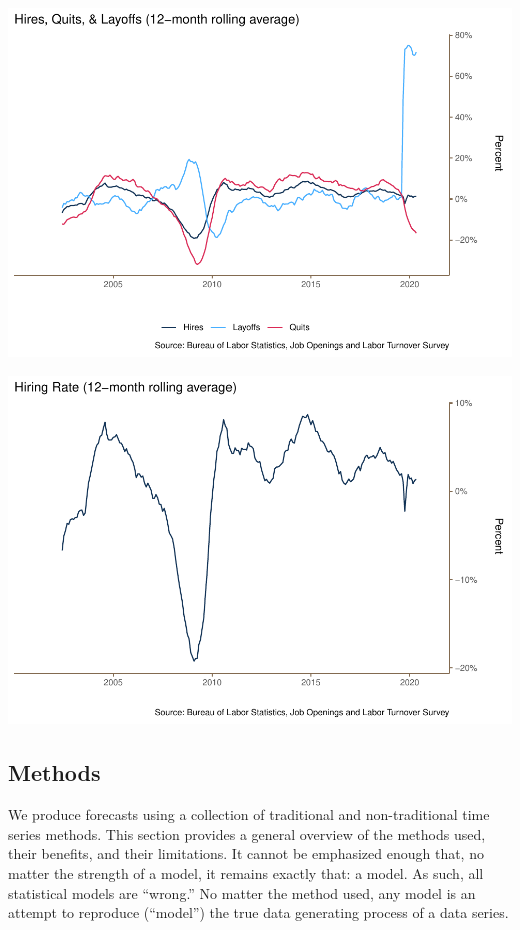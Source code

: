 \documentclass[
  11pt,
]{article}
\begin{document}
\begin{center}\includegraphics{JOLTS_files/figure-latex/unnamed-chunk-8-1} \end{center}

\begin{center}\includegraphics{JOLTS_files/figure-latex/unnamed-chunk-9-1} \end{center}

\hypertarget{methods}{%
\subsection{Methods}\label{methods}}

We produce forecasts using a collection of traditional and
non-traditional time series methods. This section provides a general
overview of the methods used, their benefits, and their limitations. It
cannot be emphasized enough that, no matter the strength of a model, it
remains exactly that: a model. As such, all statistical models are
``wrong.'' No matter the method used, any model is an attempt to
reproduce (``model'') the true data generating process of a data series.
\end{document}
